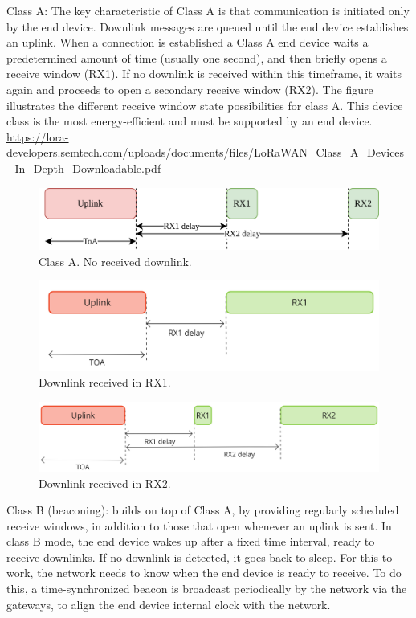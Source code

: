 Class A: The key characteristic of Class A is that communication is initiated only by the end device. Downlink messages are queued until the end device establishes an uplink. When a connection is established a Class A end device waits a predetermined amount of time (usually one second), and then briefly opens a receive window (RX1). If no downlink is received within this timeframe, it waits again and proceeds to open a secondary receive window (RX2). The figure illustrates the different receive window state possibilities for class A. 
This device class is the most energy-efficient and must be supported by an end device.
\url{https://lora-developers.semtech.com/uploads/documents/files/LoRaWAN_Class_A_Devices_In_Depth_Downloadable.pdf}

\begin{figure}[H]
    \centering
    \includegraphics[width=0.7\linewidth]{figures/ClassA_1.png}
    \caption{Class A. No received downlink.}
    \label{fig:ClassA-no}
\end{figure}

\begin{figure}[H]
    \centering
    \includegraphics[width=0.7\linewidth]{figures/ClassA_2.jpg}
    \caption{Downlink received in RX1.}
    \label{fig:ClassA-RX1}
\end{figure}

\begin{figure}[H]
    \centering
    \includegraphics[width=0.7\linewidth]{figures/ClassA_3.jpg}
    \caption{Downlink received in RX2.}
    \label{fig:ClassA-RX2}
\end{figure}

Class B (beaconing): builds on top of Class A, by providing regularly scheduled receive windows, in addition to those that open whenever an uplink is sent.
In class B mode, the end device wakes up after a fixed time interval, ready to receive downlinks. If no downlink is detected, it goes back to sleep. For this to work, the network needs to know when the end device is ready to receive. To do this, a time-synchronized beacon is broadcast periodically by the network via the gateways, to align the end device internal clock with the network.

